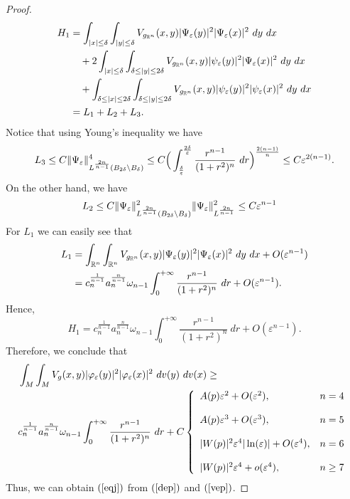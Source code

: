 \documentclass[11pt]{article}
\def \R {\mathbb{R}}
\begin{document}
{\begin{proof}
\begin{align}
H_{1}&=\int_{|x|\leq \delta}\int_{|y|\leq \delta}V_{g_{\R^{n}}}(x,y)|\Psi_{\varepsilon}(y)|^{2}|\Psi_{\varepsilon}(x)|^{2}\ dy \ dx\notag\\
&\quad+ 2\int_{|x|\leq \delta}\int_{\delta \leq |y|\leq 2\delta}V_{g_{\R^{n}}}(x,y)|\psi_{\varepsilon}(y)|^{2}|\Psi_{\varepsilon}(x)|^{2}\ dy \ dx \notag\\
&\quad+\int_{\delta\leq|x|\leq 2\delta}\int_{\delta \leq |y|\leq 2\delta}V_{g_{\R^{n}}}(x,y)|\psi_{\varepsilon}(y)|^{2}|\psi_{\varepsilon}(x)|^{2}\ dy \ dx\notag\\
&=L_{1}+L_{2}+L_{3}.\notag
\end{align}
Notice that using Young's inequality we have
\begin{align}
L_{3} \leq C\|\Psi_{\varepsilon}\|_{L^{\frac{2n}{n-1}}(B_{2\delta}\setminus B_{\delta})}^{4} \leq C\Big( \int_{\frac{\delta}{\varepsilon}}^{\frac{2\delta}{\varepsilon}}\frac{r^{n-1}}{(1+r^{2})^{n}}\ dr \Big)^{\frac{2(n-1)}{n}}
 \leq C\varepsilon^{2(n-1)}.\notag
\end{align}
On the other hand, we have
\begin{align}
L_{2}&\leq C\|\Psi_{\varepsilon}\|_{L^{\frac{2n}{n-1}}(B_{2\delta}\setminus B_{\delta})}^{2}\|\Psi_{\varepsilon}\|_{L^{\frac{2n}{n-1}}}^{2} \leq C\varepsilon^{n-1}\notag
\end{align}
For $L_1$ we can easily see that
\begin{align}
L_{1}&=\int_{\R^{n}}\int_{\R^{n}}V_{g_{\R^{n}}}(x,y)|\Psi_{\varepsilon}(y)|^{2}|\Psi_{\varepsilon}(x)|^{2} \ dy \ dx +O(\varepsilon^{n-1})\notag\\
&=c_{n}^{\frac{1}{n-1}}a_{n}^{\frac{n}{n-1}}\omega_{n-1}\int_{0}^{+\infty}\frac{r^{n-1}}{(1+r^{2})^{n}}\ dr +O(\varepsilon^{n-1}).\notag
\end{align}
Hence,
$$H_{1}=c_{n}^{\frac{1}{n-1}}a_{n}^{\frac{n}{n-1}}\omega_{n-1}\int_{0}^{+\infty}\frac{r^{n-1}}{(1+r^{2})^{n}}\ dr+O(\varepsilon^{n-1}).$$
Therefore, we conclude that
\begin{align}\label{vep}
& \int_{M}\int_{M} V_{g}(x,y)|\varphi_{\varepsilon}(y)|^{2}|\varphi_{\varepsilon}(x)|^{2}\ dv(y)\ dv(x) \geq \notag\\
& c_{n}^{\frac{1}{n-1}}a_{n}^{\frac{n}{n-1}}\omega_{n-1}\int_{0}^{+\infty}\frac{r^{n-1}}{(1+r^{2})^{n}}\ dr
+ C\left\{ \begin{array}{lll}
A(p)\varepsilon^{2}+O(\varepsilon^{2}), & n=4\\
\\
A(p)\varepsilon^{3}+O(\varepsilon^{3}), & n=5\\
\\
|W(p)|^{2}\varepsilon^{4}|\ln(\varepsilon)|+O(\varepsilon^{4}), & n=6\\
\\
|W(p)|^{2}\varepsilon^{4} + o(\varepsilon^{4}), & n\geq 7
\end{array}
\right.
\end{align}
Thus, we can obtain $(\ref{eqj})$ from $(\ref{dep})$ and $(\ref{vep})$.
\end{proof}


}
\end{document}
